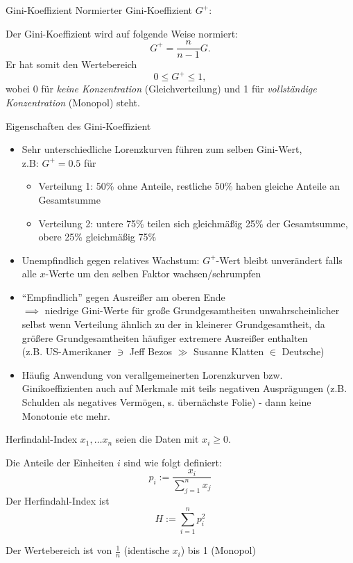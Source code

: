 \documentclass[
  10pt,
  ignorenonframetext,
]{beamer}
\providecommand{\tightlist}{%
  \setlength{\itemsep}{0pt}\setlength{\parskip}{0pt}}
\begin{document}
\begin{frame}{Gini-Koeffizient}
\protect\hypertarget{gini-koeffizient-2}{}
Normierter Gini-Koeffizient \(G^{+}\):

Der Gini-Koeffizient wird auf folgende Weise normiert: \[
      G^{+} = \frac{n}{n - 1} G.
  \] Er hat somit den Wertebereich \[
      0 \leq G^{+} \leq 1,
  \] wobei 0 für \textit{keine Konzentration} (Gleichverteilung) und 1
für \textit{vollständige Konzentration} (Monopol) steht.
\end{frame}

\begin{frame}{Eigenschaften des Gini-Koeffizient}
\protect\hypertarget{eigenschaften-des-gini-koeffizient}{}
\begin{itemize}
\item
  Sehr unterschiedliche Lorenzkurven führen zum selben Gini-Wert,\\
  z.B: \(G^{+} = 0.5\) für

  \begin{itemize}
  \tightlist
  \item
    Verteilung 1: 50\% ohne Anteile, restliche 50\% haben gleiche
    Anteile an Gesamtsumme
  \item
    Verteilung 2: untere 75\% teilen sich gleichmäßig 25\% der
    Gesamtsumme, obere 25\% gleichmäßig 75\%
  \end{itemize}
\item
  Unempfindlich gegen relatives Wachstum: \(G^{+}\)-Wert bleibt
  unverändert falls alle \(x\)-Werte um den selben Faktor
  wachsen/schrumpfen
\item
  ``Empfindlich'' gegen Ausreißer am oberen Ende\\
  \(\implies\) niedrige Gini-Werte für große Grundgesamtheiten
  unwahrscheinlicher selbst wenn Verteilung ähnlich zu der in kleinerer
  Grundgesamtheit, da größere Grundgesamtheiten häufiger extremere
  Ausreißer enthalten\\
  (z.B. US-Amerikaner \(\ni\) Jeff Bezos \(\gg\) Susanne Klatten \(\in\)
  Deutsche)
\item
  Häufig Anwendung von verallgemeinerten Lorenzkurven bzw.
  Ginikoeffizienten auch auf Merkmale mit teils negativen Ausprägungen
  (z.B. Schulden als negatives Vermögen, s. übernächste Folie) - dann
  keine Monotonie etc mehr.
\end{itemize}
\end{frame}

\begin{frame}{Herfindahl-Index}
\protect\hypertarget{herfindahl-index}{}
\(x_1,\ldots x_n\) seien die Daten mit \(x_i \ge 0\).

Die Anteile der Einheiten \(i\) sind wie folgt definiert:
\[ p_i := \frac{x_i}{\sum_{j=1}^n x_j} \] Der Herfindahl-Index ist
\[ H := \sum_{i=1}^n p_i^2 \]

Der Wertebereich ist von \(\frac{1}{n}\) (identische \(x_i\)) bis 1
(Monopol)
\end{frame}
\end{document}
